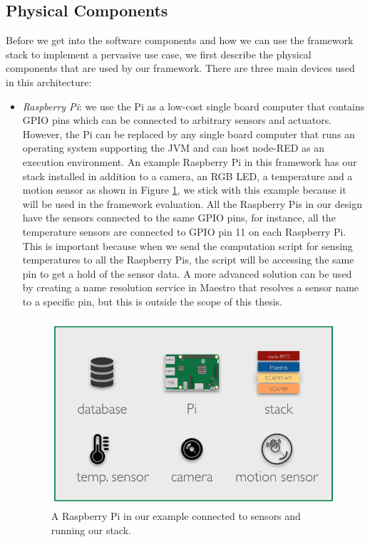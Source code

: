 \subsection{Physical Components}
Before we get into the software components and how we can use the framework stack to implement a pervasive use case, we first describe the physical components that are used by our framework. There are three main devices used in this architecture:
\begin{itemize}
\item \textit{Raspberry Pi}: we use the Pi as a low-cost single board computer that contains GPIO pins which can be connected to arbitrary sensors and actuators.  However, the Pi can be replaced by any single board computer that runs an operating system supporting the JVM and can host node-RED as an execution environment. An example Raspberry Pi in this framework has our stack installed in addition to a camera,  an RGB LED, a temperature and a motion sensor as shown in Figure \ref{fig:node}, we stick with this example because it will be used in the framework evaluation. All the Raspberry Pis in our design have the sensors connected to the same GPIO pins, for instance, all the temperature sensors are connected to GPIO pin 11 on each  Raspberry Pi. This is important because when we send the computation script for sensing temperatures to all the Raspberry Pis, the script will be accessing the same pin to get a hold of the sensor data. A more advanced solution can be used by creating a name resolution service in Maestro that resolves a sensor name to a specific pin, but this is outside the scope of this thesis.  \\



\begin{figure}[H]
	\centering
	\includegraphics[scale=0.5]{images/node.png}
	\caption{A Raspberry Pi in our example connected to sensors and running our stack. }
	\label{fig:node}
\end{figure}


\end{itemize}
